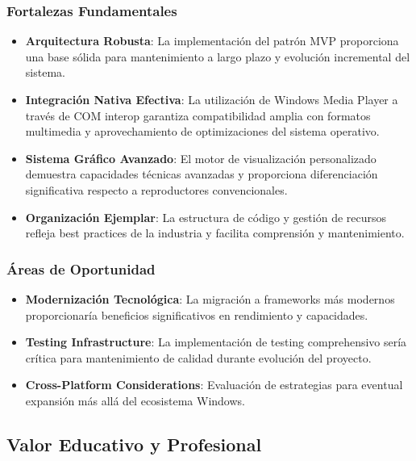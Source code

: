 \documentclass[a4paper]{article}
\begin{document}
\subsubsection{Fortalezas Fundamentales}

\begin{itemize}
\item \textbf{Arquitectura Robusta}: La implementación del patrón MVP proporciona una base sólida para mantenimiento a largo plazo y evolución incremental del sistema.

\item \textbf{Integración Nativa Efectiva}: La utilización de Windows Media Player a través de COM interop garantiza compatibilidad amplia con formatos multimedia y aprovechamiento de optimizaciones del sistema operativo.

\item \textbf{Sistema Gráfico Avanzado}: El motor de visualización personalizado demuestra capacidades técnicas avanzadas y proporciona diferenciación significativa respecto a reproductores convencionales.

\item \textbf{Organización Ejemplar}: La estructura de código y gestión de recursos refleja best practices de la industria y facilita comprensión y mantenimiento.
\end{itemize}

\subsubsection{Áreas de Oportunidad}

\begin{itemize}
\item \textbf{Modernización Tecnológica}: La migración a frameworks más modernos proporcionaría beneficios significativos en rendimiento y capacidades.

\item \textbf{Testing Infrastructure}: La implementación de testing comprehensivo sería crítica para mantenimiento de calidad durante evolución del proyecto.

\item \textbf{Cross-Platform Considerations}: Evaluación de estrategias para eventual expansión más allá del ecosistema Windows.
\end{itemize}

\subsection{Valor Educativo y Profesional}
\end{document}
